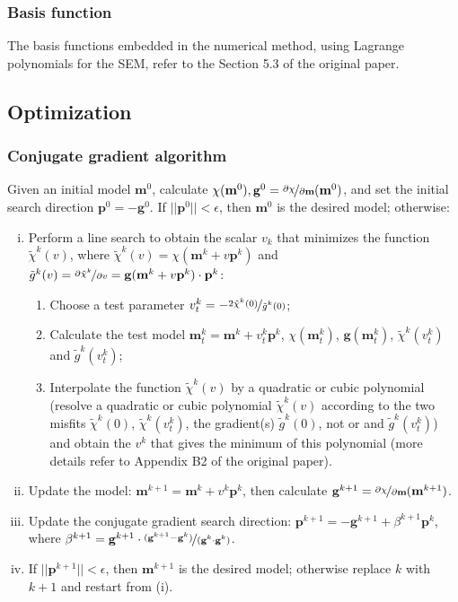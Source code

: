 \documentclass{article}
\newcommand{\mbf}[1]{\mathbf{#1}}
\newcommand{\myno}[1]{{\color{blue}#1}}
\begin{document}
\subsubsection{Basis function}
The basis functions embedded in the numerical method, using Lagrange polynomials for the SEM, refer to the Section 5.3 of the original paper.\par
\subsection{Optimization}
\subsubsection{Conjugate gradient algorithm}
Given an initial model $\mbf m^0$, calculate $\chi(\mbf m^0), \mbf g^0=\nicefrac{\partial\chi}{\partial\mbf m}(\mbf m^0)$, and set the initial search direction $\mbf p^0=-\mbf g^0$. If $||\mbf p^0||<\epsilon$, then $\mbf m^0$ is the desired model; otherwise:
\begin{enumerate}[(i)]
  \item Perform a line search to obtain the scalar $v_k$ that minimizes the function $\tilde\chi^k(v)$, where $\tilde\chi^k(v)=\chi(\mbf m^k+v\mbf p^k)$ and $\tilde g^k(v)=\nicefrac{\partial\tilde\chi^k}{\partial v}=\mbf g(\mbf m^k+v\mbf p^k)\cdot\mbf p^k$:
  \begin{enumerate}[$\bullet$]
    \item Choose a test parameter $v_t^k=-\nicefrac{2\tilde\chi^k(0)}{\tilde g^k(0)}$;
    \item Calculate the test model $\mbf m_t^k=\mbf m^k+v_t^k\mbf p^k$, $\chi(\mbf m_t^k)$, $\mbf g(\mbf m_t^k)$, $\tilde\chi^k(v_t^k)$ and $\tilde g^k(v_t^k)$;
    \item Interpolate the function $\tilde\chi^k(v)$ by a quadratic or cubic polynomial \myno{(resolve a quadratic or cubic polynomial $\tilde\chi^k(v)$ according to the two misfits $\tilde\chi^k(0)$, $\tilde\chi^k(v_t^k)$, the gradient(s) $\tilde g^k(0)$, not or and $\tilde g^k(v_t^k)$)} and obtain the $v^k$ that gives the minimum of this polynomial \myno{(more details refer to Appendix B2 of the original paper)}.
  \end{enumerate}
  \item Update the model: $\mbf m^{k+1}=\mbf m^k+v^k\mbf p^k$, then calculate $\mbf g^{k+1}=\nicefrac{\partial\chi}{\partial\mbf m}(\mbf m^{k+1})$.
  \item Update the conjugate gradient search direction: $\mbf p^{k+1}=-\mbf g^{k+1}+\beta^{k+1}\mbf p^k$, where $\beta^{k+1}=\mbf g^{k+1}\cdot\nicefrac{(\mbf g^{k+1}-\mbf g^k)}{(\mbf g^k\cdot\mbf g^k)}$.
  \item If $||\mbf p^{k+1}||<\epsilon$, then $\mbf m^{k+1}$ is the desired model; otherwise replace $k$ with $k+1$ and restart from (i).
\end{enumerate}\par
\end{document}
